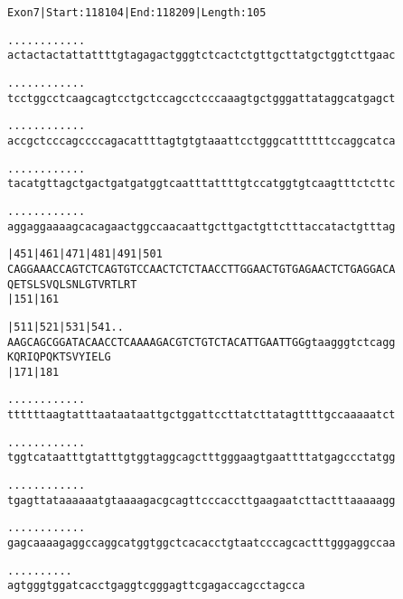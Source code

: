 \documentclass{article}
\begin{document}
\begin{alltt}
Exon 7 | Start: 118104 | End: 118209 | Length: 105

.    .    .    .    .    .    .    .    .    .    .    .    
actactactattattttgtagagactgggtctcactctgttgcttatgctggtcttgaac

.    .    .    .    .    .    .    .    .    .    .    .    
tcctggcctcaagcagtcctgctccagcctcccaaagtgctgggattataggcatgagct

.    .    .    .    .    .    .    .    .    .    .    .    
accgctcccagccccagacattttagtgtgtaaattcctgggcattttttccaggcatca

.    .    .    .    .    .    .    .    .    .    .    .    
tacatgttagctgactgatgatggtcaatttattttgtccatggtgtcaagtttctcttc

.    .    .    .    .    .    .    .    .    .    .    .    
aggaggaaaagcacagaactggccaacaattgcttgactgttctttaccatactgtttag

         |451      |461      |471      |481      |491      |501
CAGGAAACCAGTCTCAGTGTCCAACTCTCTAACCTTGGAACTGTGAGAACTCTGAGGACA
Q  E  T  S  L  S  V  Q  L  S  N  L  G  T  V  R  T  L  R  T  
         |151                          |161                 

         |511      |521      |531      |541       .    .    
AAGCAGCGGATACAACCTCAAAAGACGTCTGTCTACATTGAATTGGgtaagggtctcagg
K  Q  R  I  Q  P  Q  K  T  S  V  Y  I  E  L  G              
         |171                          |181                 

.    .    .    .    .    .    .    .    .    .    .    .    
ttttttaagtatttaataataattgctggattccttatcttatagttttgccaaaaatct

.    .    .    .    .    .    .    .    .    .    .    .    
tggtcataatttgtatttgtggtaggcagctttgggaagtgaattttatgagccctatgg

.    .    .    .    .    .    .    .    .    .    .    .    
tgagttataaaaaatgtaaaagacgcagttcccaccttgaagaatcttactttaaaaagg

.    .    .    .    .    .    .    .    .    .    .    .    
gagcaaaagaggccaggcatggtggctcacacctgtaatcccagcactttgggaggccaa

.    .    .    .    .    .    .    .    .    .
agtgggtggatcacctgaggtcgggagttcgagaccagcctagcca
\end{alltt}
\newpage
\end{document}
